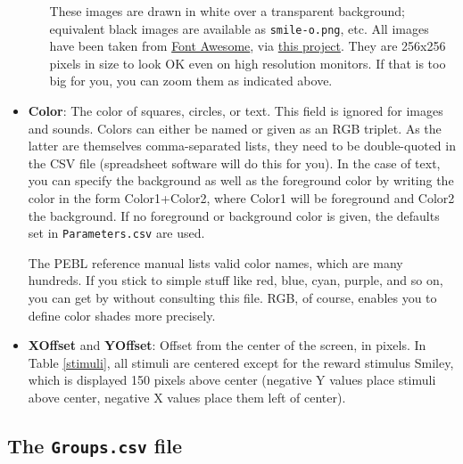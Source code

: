 \documentclass[11pt,]{article}
\begin{document}
\begin{itemize}
\begin{itemize}
    These images are drawn in white over a transparent background;
    equivalent black images are available as \texttt{smile-o.png}, etc.
    All images have been taken from
    \href{http://fortawesome.github.io/Font-Awesome}{Font Awesome}, via
    \href{https://github.com/encharm/Font-Awesome-SVG-PNG}{this
    project}. They are 256x256 pixels in size to look OK even on high
    resolution monitors. If that is too big for you, you can zoom them
    as indicated above.
  \end{itemize}
\item
  \textbf{Color}: The color of squares, circles, or text. This field is
  ignored for images and sounds. Colors can either be named or given as
  an RGB triplet. As the latter are themselves comma-separated lists,
  they need to be double-quoted in the CSV file (spreadsheet software
  will do this for you). In the case of text, you can specify the
  background as well as the foreground color by writing the color in the
  form Color1+Color2, where Color1 will be foreground and Color2 the
  background. If no foreground or background color is given, the
  defaults set in \texttt{Parameters.csv} are used.

  The PEBL reference manual lists valid color names, which are many
  hundreds. If you stick to simple stuff like red, blue, cyan, purple,
  and so on, you can get by without consulting this file. RGB, of
  course, enables you to define color shades more precisely.
\item
  \textbf{XOffset} and \textbf{YOffset}: Offset from the center of the
  screen, in pixels. In Table \ref{stimuli}, all stimuli are centered
  except for the reward stimulus Smiley, which is displayed 150 pixels
  above center (negative Y values place stimuli above center, negative X
  values place them left of center).
\end{itemize}

\subsection{The \texttt{Groups.csv} file}\label{the-groups.csv-file}
\end{document}
